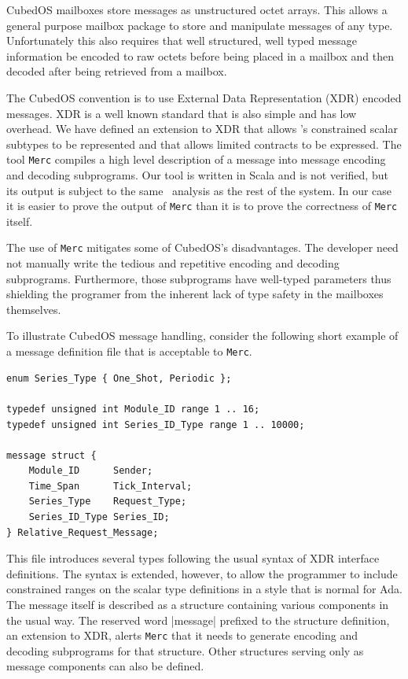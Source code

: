 CubedOS mailboxes store messages as unstructured octet arrays. This allows a general purpose
mailbox package to store and manipulate messages of any type. Unfortunately this also requires
that well structured, well typed message information be encoded to raw octets before being
placed in a mailbox and then decoded after being retrieved from a mailbox.

The CubedOS convention is to use External Data Representation (XDR) encoded messages. XDR is a
well known standard \cite{rfc-4506} that is also simple and has low overhead. We have defined an
extension to XDR that allows \SPARK's constrained scalar subtypes to be represented and that
allows limited contracts to be expressed. The tool \texttt{Merc} compiles a high level
description of a message into message encoding and decoding subprograms. Our tool is written in
Scala and is not verified, but its output is subject to the same \SPARK\ analysis as the rest of
the system. In our case it is easier to prove the output of \texttt{Merc} than it is to prove
the correctness of \texttt{Merc} itself.

The use of \texttt{Merc} mitigates some of CubedOS's disadvantages. The developer need not
manually write the tedious and repetitive encoding and decoding subprograms. Furthermore, those
subprograms have well-typed parameters thus shielding the programer from the inherent lack of
type safety in the mailboxes themselves.

To illustrate CubedOS message handling, consider the following short example of a message
definition file that is acceptable to \texttt{Merc}.

\begin{verbatim}
enum Series_Type { One_Shot, Periodic };

typedef unsigned int Module_ID range 1 .. 16;
typedef unsigned int Series_ID_Type range 1 .. 10000;

message struct {
    Module_ID      Sender;
    Time_Span      Tick_Interval;
    Series_Type    Request_Type;
    Series_ID_Type Series_ID;
} Relative_Request_Message;
\end{verbatim}

This file introduces several types following the usual syntax of XDR interface definitions. The
syntax is extended, however, to allow the programmer to include constrained ranges on the scalar
type definitions in a style that is normal for Ada. The message itself is described as a
structure containing various components in the usual way. The reserved word |message| prefixed
to the structure definition, an extension to XDR, alerts \texttt{Merc} that it needs to generate
encoding and decoding subprograms for that structure. Other structures serving only as message
components can also be defined.

